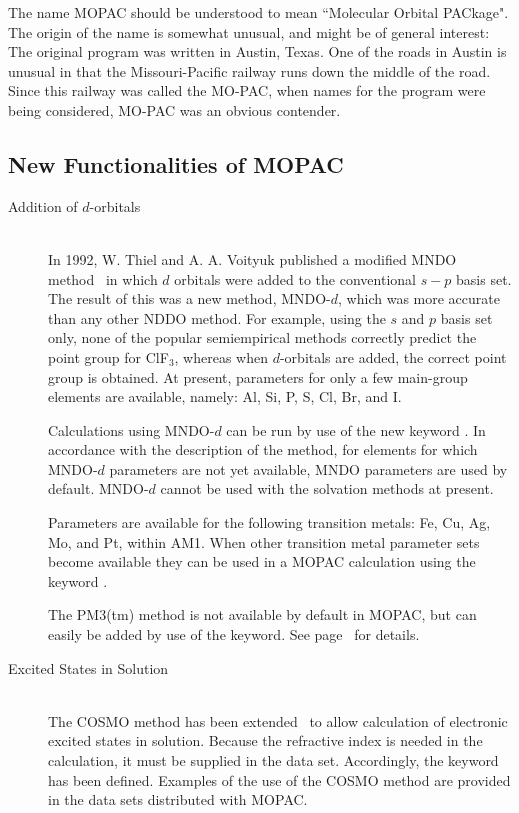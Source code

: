 The name MOPAC should be understood to mean ``Molecular Orbital PACkage". The
origin of the name is somewhat unusual, and might be of general interest: The
original program was written in Austin, Texas. One of the roads in Austin is
unusual in that the Missouri-Pacific railway runs down the middle of the road.
Since this railway was called the MO-PAC, when names for the program were being
considered, MO-PAC was an obvious contender.

\subsection{New Functionalities of MOPAC}
\begin{description}
\item[Addition of $d$-orbitals]~\\
In 1992, W. Thiel and A. A. Voityuk published a  modified MNDO
method~\cite{mndod_0} in which $d$ orbitals were added to  the conventional
$s-p$ basis set. The result of this was a new method, MNDO-$d$, which was more
accurate than any other NDDO method.  For example, using the $s$ and $p$ basis
set only, none of the popular semiempirical methods  correctly predict the
point group for ClF$_3$, whereas when $d$-orbitals are added, the correct
point group is obtained. At present, parameters for only a few main-group
elements are available, namely: Al, Si, P, S, Cl, Br, and I.

Calculations using MNDO-$d$ can be run by use of the new keyword .
In accordance with the description of the method, for elements for which
MNDO-$d$ parameters are not yet available, MNDO parameters are used by
default.  MNDO-$d$ cannot be used with the solvation methods at present.

Parameters are available for the following transition metals:  Fe, Cu, Ag,
Mo, and Pt, within AM1.
When other transition metal parameter sets become available they
can be used in a MOPAC calculation using the keyword .

The PM3(tm) method is not available by default in MOPAC, but can easily be
added by use of the  keyword. See page~\pageref{pm3tm} for details.

\item[Excited States in Solution]~\\
The COSMO method has been extended~\cite{cosmo-rs} to allow calculation of
electronic excited states in solution.  Because the refractive index is needed
in the calculation, it must be supplied in the data set.  Accordingly, the
keyword   has been defined.  Examples of the use of  the COSMO
method are provided in the data sets distributed with MOPAC.


\end{description}
